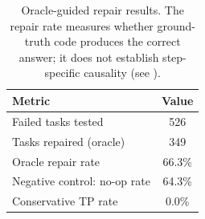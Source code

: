\begin{table}[t]
\centering
\caption{Oracle-guided repair results. The repair rate measures whether ground-truth code produces the correct answer; it does not establish step-specific causality (see ).}
\label{tab:oracle-repair}
\small
\begin{tabular}{@{}lc@{}}
\toprule
Metric & Value \\
\midrule
Failed tasks tested & 526 \\
Tasks repaired (oracle) & 349 \\
Oracle repair rate & 66.3\% \\
\midrule
Negative control: no-op rate & 64.3\% \\
Conservative TP rate & 0.0\% \\
\bottomrule
\end{tabular}
\end{table}
